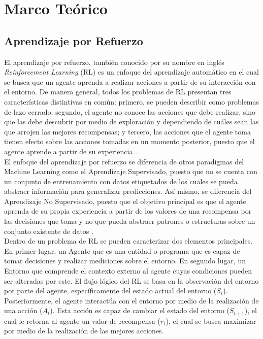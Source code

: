 \section{Marco Teórico}

\subsection{Aprendizaje por Refuerzo}
El aprendizaje por refuerzo, también conocido por su nombre en inglés \textit{Reinforcement Learning} (RL) es un enfoque del aprendizaje automático en el cual se busca que un agente aprenda a realizar acciones a partir de su interacción con el entorno. De manera general, todos los problemas de RL presentan tres características distintivas en común: primero, se pueden describir como problemas de lazo cerrado; segundo, el agente no conoce las acciones que debe realizar, sino que las debe descubrir por medio de exploración y dependiendo de cuáles sean las que arrojen las mejores recompensas; y tercero, las acciones que el agente toma tienen efecto sobre las acciones tomadas en un momento posterior, puesto que el agente aprende a partir de su experiencia \parencite{sutton2018reinforcement}.\\

El enfoque del aprendizaje por refuerzo se diferencia de otros paradigmas del Machine Learning como el Aprendizaje Supervisado, puesto que no se cuenta con un conjunto de entrenamiento con datos etiquetados de los cuales se pueda abstraer información para generalizar predicciones. Así mismo, se diferencia del Aprendizaje No Supervisado, puesto que el objetivo principal es que el agente aprenda de su propia experiencia a partir de los valores de una recompensa por las decisiones que toma y no que pueda abstraer patrones o estructuras sobre un conjunto existente de datos \parencite{sutton2018reinforcement}.\\

Dentro de un problema de RL se pueden caracterizar dos elementos principales. En primer lugar, un Agente que es una entidad o programa que es capaz de tomar decisiones y realizar mediciones sobre el entorno. En segundo lugar, un Entorno que comprende el contexto externo al agente cuyas condiciones pueden ser alteradas por este. El flujo lógico del RL se basa en la observación del entorno por parte del agente, específicamente del estado actual del entorno ($S_t$). Posteriormente, el agente interactúa con el entorno por medio de la realización de una acción ($A_t$). Esta acción es capaz de cambiar el estado del entorno ($S_{t+1}$), el cual le retorna al agente un valor de recompensa ($r_t$), el cual se busca maximizar por medio de la realización de las mejores acciones.\\

